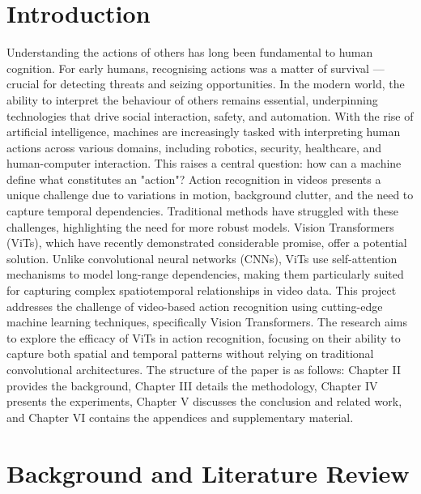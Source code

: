 \documentclass[conference]{IEEEtran}
\begin{document}
\section{Introduction}
Understanding the actions of others has long been fundamental to human cognition. For early humans, recognising actions was a matter of survival — crucial for detecting threats and seizing opportunities. In the modern world, the ability to interpret the behaviour of others remains essential, underpinning technologies that drive social interaction, safety, and automation.
With the rise of artificial intelligence, machines are increasingly tasked with interpreting human actions across various domains, including robotics, security, healthcare, and human-computer interaction. This raises a central question: how can a machine define what constitutes an "action"?
Action recognition in videos presents a unique challenge due to variations in motion, background clutter, and the need to capture temporal dependencies. Traditional methods have struggled with these challenges, highlighting the need for more robust models. Vision Transformers (ViTs), which have recently demonstrated considerable promise, offer a potential solution. Unlike convolutional neural networks (CNNs), ViTs use self-attention mechanisms to model long-range dependencies, making them particularly suited for capturing complex spatiotemporal relationships in video data.
This project addresses the challenge of video-based action recognition using cutting-edge machine learning techniques, specifically Vision Transformers. The research aims to explore the efficacy of ViTs in action recognition, focusing on their ability to capture both spatial and temporal patterns without relying on traditional convolutional architectures.
The structure of the paper is as follows: Chapter II provides the background, Chapter III details the methodology, Chapter IV presents the experiments, Chapter V discusses the conclusion and related work, and Chapter VI contains the appendices and supplementary material.



\section{Background and Literature Review}
\end{document}
